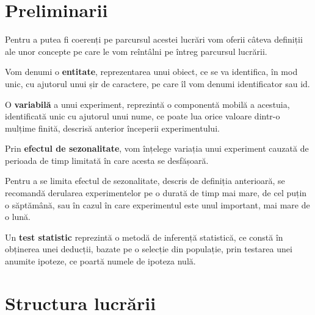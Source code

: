\section{Preliminarii}

Pentru a putea fi coerenți pe parcursul acestei lucrări vom oferii câteva definiții ale unor concepte pe care le vom reîntâlni pe întreg parcursul lucrării.

\begin{definition}
	\label{def:entity}
	Vom denumi o \textbf{entitate}, reprezentarea unui obiect, ce se va identifica, în mod unic, cu ajutorul unui șir de caractere, pe care îl vom denumi identificator sau id.
\end{definition}

\begin{definition}
	\label{def:variable}
	O \textbf{variabilă} a unui experiment, reprezintă o componentă mobilă a acestuia, identificată unic cu ajutorul unui nume, ce poate lua orice valoare dintr-o mulțime finită, descrisă anterior începerii experimentului.
\end{definition}

\begin{definition}
	\label{def:sesonality}
	Prin \textbf{efectul de sezonalitate}, vom înțelege variația unui experiment cauzată de perioada de timp limitată în care acesta se desfășoară.
\end{definition}

\begin{remark}
	\label{remark:sesonality}
	Pentru a se limita efectul de sezonalitate, descris de definiția anterioară, se recomandă derularea experimentelor pe o durată de timp mai mare, de cel puțin o săptămână, sau în cazul în care experimentul este unul important, mai mare de o lună.
\end{remark}

\begin{definition}
	\label{def:statistic_test}
	Un \textbf{test statistic} reprezintă o metodă de inferență statistică, ce constă în obținerea unei deducții, bazate pe o selecție din populație, prin testarea unei anumite ipoteze, ce poartă numele de ipoteza nulă.
\end{definition}

\section{Structura lucrării}

